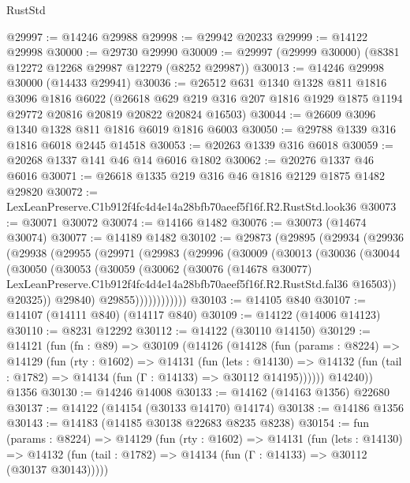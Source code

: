 \begin{lexlean}{RustStd}
\begin{coremodule}
@29997 := @14246 @29988
@29998 := @29942 @20233
@29999 := @14122 @29998
@30000 := @29730 @29990
@30009 := @29997 (@29999 @30000) (@8381 @12272 @12268 @29987 @12279 (@8252 @29987))
@30013 := @14246 @29998 @30000 (@14433 @29941)
@30036 := @26512
    @631
    @1340
    @1328
    @811
    @1816
    @3096
    @1816
    @6022
    (@26618 @629 @219 @316 @207 @1816 @1929 @1875 @1194 @29772 @20816 @20819 @20822 @20824 @16503)
@30044 := @26609 @3096 @1340 @1328 @811 @1816 @6019 @1816 @6003
@30050 := @29788 @1339 @316 @1816 @6018 @2445 @14518
@30053 := @20263 @1339 @316 @6018
@30059 := @20268 @1337 @141 @46 @14 @6016 @1802
@30062 := @20276 @1337 @46 @6016
@30071 := @26618 @1335 @219 @316 @46 @1816 @2129 @1875 @1482 @29820
@30072 := LexLeanPreserve.C1b912f4fc4d4e14a28bfb70aeef5f16f.R2.RustStd.look36
@30073 := @30071 @30072
@30074 := @14166 @1482
@30076 := @30073 (@14674 @30074)
@30077 := @14189 @1482
@30102 := @29873
    (@29895
      (@29934
        (@29936
          (@29938
            (@29955
              (@29971
                (@29983
                  (@29996
                    (@30009
                      (@30013
                        (@30036
                          (@30044
                            (@30050
                              (@30053
                                (@30059
                                  (@30062
                                    (@30076
                                      (@14678 @30077)
                                      LexLeanPreserve.C1b912f4fc4d4e14a28bfb70aeef5f16f.R2.RustStd.fal36
                                      @16503))
                                  @20325))
                              @29840)
                            @29855))))))))))))
@30103 := @14105 @840
@30107 := @14107 (@14111 @840) (@14117 @840)
@30109 := @14122 (@14006 @14123)
@30110 := @8231 @12292
@30112 := @14122 (@30110 @14150)
@30129 := @14121
    (fun (fn : @89) =>
    @30109
      (@14126
        (@14128
          (fun (params : @8224) =>
          @14129
            (fun (rty : @1602) =>
            @14131
              (fun (lets : @14130) =>
              @14132 (fun (tail : @1782) => @14134 (fun (Γ : @14133) => @30112 @14195))))))
        @14240))
    @1356
@30130 := @14246 @14008
@30133 := @14162 (@14163 @1356) @22680
@30137 := @14122 (@14154 (@30133 @14170) @14174)
@30138 := @14186 @1356
@30143 := @14183 (@14185 @30138 @22683 @8235 @8238)
@30154 := fun (params : @8224) =>
  @14129
    (fun (rty : @1602) =>
    @14131
      (fun (lets : @14130) =>
      @14132 (fun (tail : @1782) => @14134 (fun (Γ : @14133) => @30112 (@30137 @30143)))))

\end{coremodule}
\end{lexlean}
